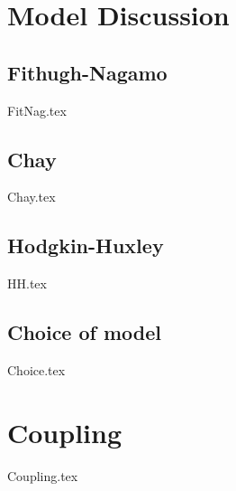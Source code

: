 \chapter{Model Discussion}\label{ch:modelDis}
\section{Fithugh-Nagamo}
{FitNag.tex}

\newpage
\section{Chay}
{Chay.tex}

\newpage
\section{Hodgkin-Huxley}
{HH.tex}

\newpage
\section{Choice of model}
{Choice.tex}

\newpage
\chapter{Coupling}
{Coupling.tex}